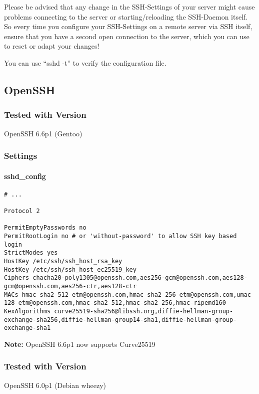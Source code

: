 \begin{mdframed}[style=warningboxstyle]
	Please be advised that any change in the SSH-Settings of your server might cause problems connecting to the server or starting/reloading the SSH-Daemon itself.
	So every time you configure your SSH-Settings on a remote server via SSH itself, ensure that you have a second open connection to the server, which you can use to reset or adapt your changes!

        You can use ``sshd -t'' to verify the configuration file.
\end{mdframed}

\subsection{OpenSSH}

\subsubsection{Tested with Version} OpenSSH 6.6p1 (Gentoo)
\subsubsection{Settings}
\paragraph*{sshd\_config}
\begin{lstlisting}[breaklines]
# ...

Protocol 2

PermitEmptyPasswords no
PermitRootLogin no # or 'without-password' to allow SSH key based login
StrictModes yes
HostKey /etc/ssh/ssh_host_rsa_key
HostKey /etc/ssh/ssh_host_ec25519_key
Ciphers chacha20-poly1305@openssh.com,aes256-gcm@openssh.com,aes128-gcm@openssh.com,aes256-ctr,aes128-ctr
MACs hmac-sha2-512-etm@openssh.com,hmac-sha2-256-etm@openssh.com,umac-128-etm@openssh.com,hmac-sha2-512,hmac-sha2-256,hmac-ripemd160
KexAlgorithms curve25519-sha256@libssh.org,diffie-hellman-group-exchange-sha256,diffie-hellman-group14-sha1,diffie-hellman-group-exchange-sha1
\end{lstlisting}
\textbf{Note:} OpenSSH 6.6p1 now supports Curve25519

\subsubsection{Tested with Version} OpenSSH 6.0p1 (Debian wheezy)

